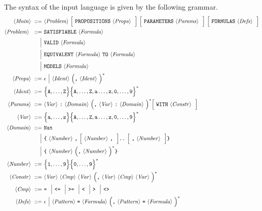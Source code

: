 \documentclass[twoside]{article}
\begin{document}
The syntax of the \DiMo input language is given by the following grammar.
\begin{align*}
\nonterm{Main} ::=\ & \nonterm{Problem} \optional{\term{PROPOSITIONS} \nonterm{Props}}\ 
                                         \optional{\term{PARAMETERS} \nonterm{Params}}\ 
                                         \optional{\term{FORMULAS} \nonterm{Defs}} \\
\nonterm{Problem}\ ::=\ & \term{SATISFIABLE} \nonterm{Formula} \\
                 \altn & \term{VALID} \nonterm{Formula} \\
                 \altn & \term{EQUIVALENT} \nonterm{Formula} \term{TO} \nonterm{Formula} \\
                 \altn & \term{MODELS} \nonterm{Formula} \\
\nonterm{Props} ::=\ & \epsilon \altn \nonterm{Ident} \Big(\term{,} \nonterm{Ident}\Big)^* \\
\nonterm{Ident} ::=\ & \enumset{\texttt{A},\ldots,\texttt{Z}}\enumset{\texttt{A},\ldots,\texttt{Z},\texttt{a}\ldots,\texttt{z},\texttt{0},\ldots,\texttt{9}}^* \\
\nonterm{Params} ::=\ & \nonterm{Var} \term{:} \nonterm{Domain} \Big( \term{,} \nonterm{Var} \term{:} \nonterm{Domain} \Big)^* 
                           \optional{\term{WITH} \nonterm{Constr}} \\
\nonterm{Var} ::=\ & \enumset{\texttt{a},\ldots,\texttt{z}}\enumset{\texttt{A},\ldots,\texttt{Z},\texttt{a}\ldots,\texttt{z},\texttt{0},\ldots,\texttt{9}}^* \\ 
\nonterm{Domain} ::=\ & \term{Nat} \\
                \altn & \term{\{} \nonterm{Number} \term{,} \optional{\nonterm{Number} \term{,}} \term{..} 
                                         \optional{\term{,} \nonterm{Number}} \term{\}} \\
                \altn & \term{\{} \nonterm{Number} \group{\term{,} \nonterm{Number}}^* \term{\}} \\
\nonterm{Number} ::=\ & \enumset{\texttt{1},\ldots,\texttt{9}}\enumset{\texttt{0},\ldots,\texttt{9}}^* \\ 
\nonterm{Constr} ::=\ & \nonterm{Var} \nonterm{Cmp} \nonterm{Var} \group{\term{,} \nonterm{Var} \nonterm{Cmp} \nonterm{Var}}^* \\
\nonterm{Cmp} ::=\ & \term{=} \altn \term{<=} \altn \term{>=} \altn \term{<} \altn \term{>} \altn \term{<>} \\ 
\nonterm{Defs} ::=\ & \epsilon \altn \nonterm{Pattern} \term{=} \nonterm{Formula} \group{\term{,} \nonterm{Pattern} \term{=} \nonterm{Formula}}^* \\

\end{align*}
\end{document}
